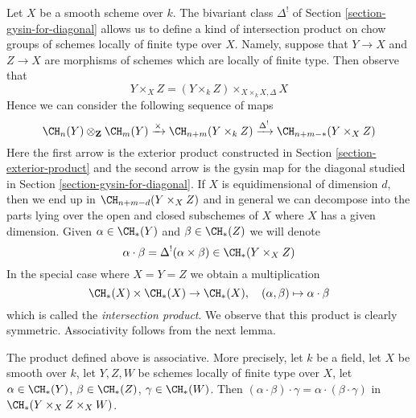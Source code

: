 \medskip\noindent
Let $X$ be a smooth scheme over $k$. The bivariant class $\Delta^!$
of Section \ref{section-gysin-for-diagonal} allows us to define a kind of
intersection product on chow groups of schemes locally of finite type over $X$.
Namely, suppose that $Y \to X$ and $Z \to X$ are morphisms of schemes
which are locally of finite type. Then observe that
$$
Y \times_X Z =  (Y \times_k Z) \times_{X \times_k X, \Delta} X
$$
Hence we can consider the following sequence of maps
$$
\CH_n(Y) \otimes_\mathbf{Z} \CH_m(Y)
\xrightarrow{\times}
\CH_{n + m}(Y \times_k Z)
\xrightarrow{\Delta^!}
\CH_{n + m - *}(Y \times_X Z)
$$
Here the first arrow is the exterior product constructed in
Section \ref{section-exterior-product} and the second arrow
is the gysin map for the diagonal studied in
Section \ref{section-gysin-for-diagonal}. If $X$ is equidimensional
of dimension $d$, then we end up in $\CH_{n + m - d}(Y \times_X Z)$
and in general we can decompose into the parts lying over the open
and closed subschemes of $X$ where $X$ has a given dimension.
Given $\alpha \in \CH_*(Y)$ and $\beta \in \CH_*(Z)$ we will denote
$$
\alpha \cdot \beta = \Delta^!(\alpha \times \beta)
\in \CH_*(Y \times_X Z)
$$
In the special case where $X = Y = Z$ we obtain a multiplication
$$
\CH_*(X) \times \CH_*(X) \to \CH_*(X),\quad
(\alpha, \beta) \mapsto \alpha \cdot \beta
$$
which is called the {\it intersection product}. We observe that
this product is clearly symmetric. Associativity follows from
the next lemma.

\begin{lemma}
\label{lemma-associative}
The product defined above is associative. More precisely, let $k$ be a field,
let $X$ be smooth over $k$,
let $Y, Z, W$ be schemes locally of finite type over $X$, let
$\alpha \in \CH_*(Y)$, $\beta \in \CH_*(Z)$, $\gamma \in \CH_*(W)$.
Then $(\alpha \cdot \beta) \cdot \gamma =
\alpha \cdot (\beta \cdot \gamma)$ in $\CH_*(Y \times_X Z \times_X W)$.
\end{lemma}

